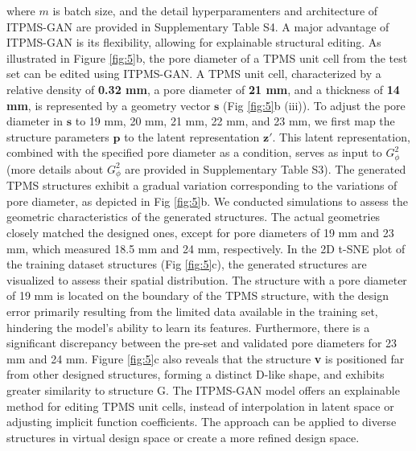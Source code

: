 \documentclass[preprint,review,12pt,authoryear]{elsarticle}
\begin{document}
where $m$ is batch size, and the detail hyperparamenters and architecture of ITPMS-GAN are provided in Supplementary Table S4. A major advantage of ITPMS-GAN is its flexibility, allowing for explainable structural editing. As illustrated in Figure \ref{fig:5}b, the pore diameter of a TPMS unit cell from the test set can be edited using ITPMS-GAN. A TPMS unit cell, characterized by a relative density of\textbf{ 0.32 mm}, a pore diameter of \textbf{21 mm}, and a thickness of \textbf{14 mm}, is represented by a geometry vector $\boldsymbol{s}$ (Fig \ref{fig:5}b (iii)). To adjust the pore diameter in $\boldsymbol{s}$ to 19 mm, 20 mm, 21 mm, 22 mm, and 23 mm, we first map the structure parameters $\boldsymbol{p}$ to the latent representation $\boldsymbol{z}'$. This latent representation, combined with the specified pore diameter as a condition, serves as input to $G_\phi^2$ (more details about $G^2_\phi$ are provided in Supplementary Table S3). The generated TPMS structures exhibit a gradual variation corresponding to the variations of pore diameter, as depicted in Fig \ref{fig:5}b. We conducted simulations to assess the geometric characteristics of the generated structures. The actual geometries closely matched the designed ones, except for pore diameters of 19 mm and 23 mm, which measured 18.5 mm and 24 mm, respectively. In the 2D t-SNE plot of the training dataset structures (Fig \ref{fig:5}c), the generated structures are visualized to assess their spatial distribution. The structure with a pore diameter of 19 mm is located on the boundary of the TPMS structure, with the design error primarily resulting from the limited data available in the training set, hindering the model's ability to learn its features. Furthermore, there is a significant discrepancy between the pre-set and validated pore diameters for 23 mm and 24 mm. Figure \ref{fig:5}c also reveals that the structure \textbf{v} is positioned far from other designed structures, forming a distinct D-like shape, and exhibits greater similarity to structure G. The ITPMS-GAN model offers an explainable method for editing TPMS unit cells, instead of interpolation in latent space or adjusting implicit function coefficients. The approach can be applied to diverse structures in virtual design space or create a more refined design space.
\end{document}

